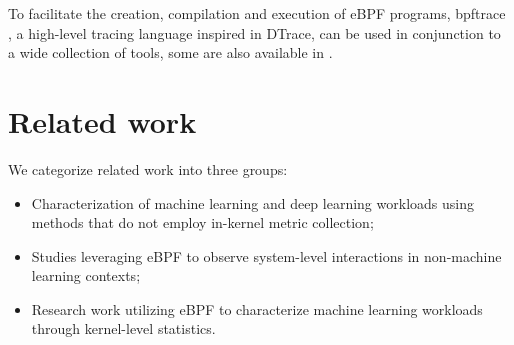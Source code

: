 \documentclass[conference]{IEEEtran}
\begin{document}
    To facilitate the creation, compilation and execution of eBPF programs, bpftrace \cite{bpftrace}, a high-level tracing language inspired in DTrace, can be used in conjunction to a wide collection of tools, some are also available in \cite{bgreggBook}.

\section{Related work}

We categorize related work into three groups: 
\begin{itemize}
    \item Characterization of machine learning and deep learning workloads using methods that do not employ in-kernel metric collection;
    \item Studies leveraging eBPF to observe system-level interactions in non-machine learning contexts;
    \item Research work utilizing eBPF to characterize machine learning workloads through kernel-level statistics. 
\end{itemize}
\end{document}
